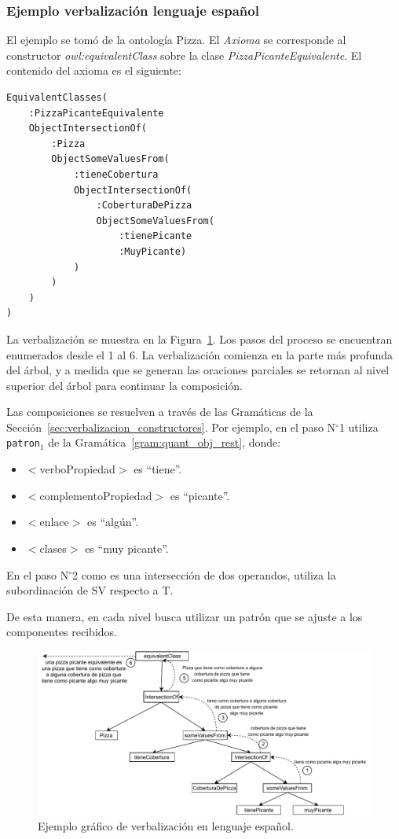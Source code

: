 \subsubsection{Ejemplo verbalización lenguaje español}
El ejemplo se tomó de la ontología Pizza. El \textit{Axioma }se corresponde al constructor \emph{owl:equivalentClass} sobre la clase \emph{PizzaPicanteEquivalente}. El contenido del axioma es el siguiente: 
\begin{verbatim}
EquivalentClasses(
    :PizzaPicanteEquivalente
    ObjectIntersectionOf(
        :Pizza
        ObjectSomeValuesFrom(
            :tieneCobertura
            ObjectIntersectionOf(
                :CoberturaDePizza
                ObjectSomeValuesFrom(
                    :tienePicante
                    :MuyPicante)
            )
        )
    )
)    
\end{verbatim}
La verbalización se muestra en la Figura~\ref{fig:ejemplo_verb_espaniol}.
Los pasos del proceso se encuentran enumerados desde el 1 al 6. La verbalización comienza en la parte más profunda del árbol, y a medida que se generan las oraciones parciales se retornan al nivel superior del árbol para continuar la composición.

Las composiciones se resuelven a través de las Gramáticas de la Sección~\ref{sec:verbalizacion_constructores}. Por ejemplo, en el paso N$^\circ$1 utiliza {\tt patron$_1$} de la Gramática~\ref{gram:quant_obj_rest}, donde:
\begin{itemize}
    \item $<$verboPropiedad$>$ es ``tiene''.
    \item $<$complementoPropiedad$>$ es ``picante''.
    \item $<$enlace$>$ es ``algún''.
    \item $<$clases$>$ es ``muy picante''.
\end{itemize}

En el paso N$^\circ$2 como es una intersección de dos operandos, utiliza la subordinación de SV respecto a T.

De esta manera, en cada nivel busca utilizar un patrón que se ajuste a los componentes recibidos.

\begin{figure}
    \centering
    \includegraphics[width=\textwidth]{img/generacion_documento/verbalizacion_equivalentClass_spanish.pdf}
    \caption{Ejemplo gráfico de verbalización en lenguaje español.}
    \label{fig:ejemplo_verb_espaniol}
\end{figure}

